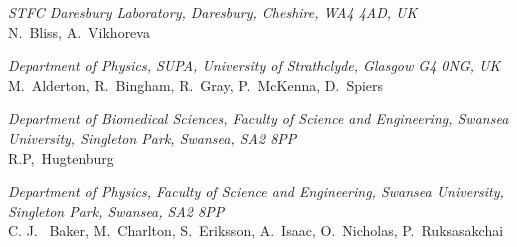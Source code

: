 \vspace{0.5cm}
\noindent \textit{STFC Daresbury Laboratory, Daresbury, Cheshire, WA4 4AD, UK} \\
N.~Bliss, A.~Vikhoreva
 
\vspace{0.5cm}
\noindent \textit{Department of Physics, SUPA, University of Strathclyde, Glasgow G4 0NG, UK} \\
M.~Alderton, R.~Bingham, R.~Gray, P.~McKenna, D.~Spiers
 
\vspace{0.5cm}
\noindent \textit{Department of Biomedical Sciences, Faculty of Science and Engineering, Swansea University, Singleton Park, Swansea, SA2 8PP} \\
R.P,~Hugtenburg
 
\vspace{0.5cm}
\noindent \textit{Department of Physics, Faculty of Science and Engineering, Swansea University, Singleton Park, Swansea, SA2 8PP} \\
C. J. ~Baker, M.~Charlton, S.~Eriksson, A.~Isaac, O.~Nicholas, P.~Ruksasakchai
 
\vspace{0.5cm}
